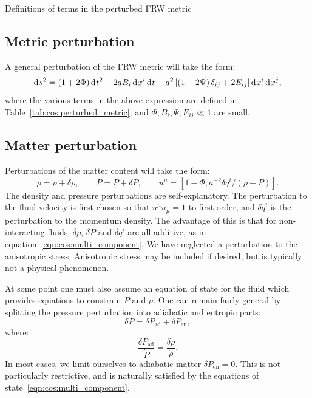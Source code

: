 \begin{table}[tp]
  \centering
  
  \caption{Definitions of terms in the perturbed FRW metric}\label{tab:cos:perturbed_metric}
\end{table}


\subsection{Metric perturbation}
A general perturbation of the FRW metric will take the form:
\begin{equation}
  \operatorname{d}^{}\!{s}^2 = (1+2\Phi)\operatorname{d}^{}\!{t}^2 -2a B_i \operatorname{d}^{}\!{x}^i \operatorname{d}^{}\!{t}  -a^2 \left[ \left( 1 - 2 \Psi \right)\delta_{ij} + 2E_{ij} \right] \operatorname{d}^{}\!{x}^i \operatorname{d}^{}\!{x}^j,
  \label{eqn:cos:FRW_perturb}
\end{equation}
where the various terms in the above expression are defined in Table~\ref{tab:cos:perturbed_metric}, and ${\Phi,B_i,\Psi,E_{ij}\ll1}$ are small. 

\subsection{Matter perturbation}
Perturbations of the matter content will take the form:
\begin{equation}
  \rho = \rho + \delta \rho, \qquad 
  P = P + \delta P, \qquad
  u^\mu = \left[ 1-\Phi, a^{-2} \delta q^i/(\rho+P)\right].
  \label{eqn:cos:matter_perturb}
\end{equation}
The density and pressure perturbations are self-explanatory. The perturbation to the fluid velocity is first chosen so that $u^\mu u_\mu=1$ to first order, and $\delta q^i$ is the perturbation to the momentum density. The advantage of this is that for non-interacting fluids, $\delta\rho$, $\delta P$ and $\delta q^i$ are all additive, as in equation~\eqref{eqn:cos:multi_component}. We have neglected a perturbation to the anisotropic stress. Anisotropic stress may be included if desired, but is typically not a physical phenomenon. 

At some point one must also assume an equation of state for the fluid which provides equations to constrain $P$ and $\rho$. One can remain fairly general by splitting the pressure perturbation into adiabatic and entropic parts:
\begin{equation}
  \delta P = \delta P_\mathrm{ad} + \delta P_\mathrm{en},
  \label{eqn:cos:adiabatic_entropic}
\end{equation} 
where:
\begin{equation}
  \frac{\delta P_\mathrm{ad}}{\dot{P}} = \frac{\delta\rho}{\dot{\rho}}.
  \label{eqn:cos:adiabatic}
\end{equation} 
In most cases, we limit ourselves to adiabatic matter $\delta P_\mathrm{en}=0$.
This is not particularly restrictive, and is naturally satisfied by the equations of state~\eqref{eqn:cos:multi_component}.

